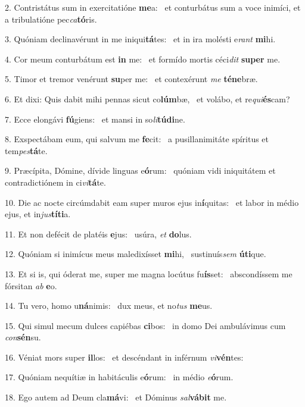 2. Contristátus sum in exercitatióne \textbf{me}a: \ast\  et conturbátus sum a voce inimíci, et a tribulatióne pec\textit{ca}\textbf{tó}ris.\

3. Quóniam declinavérunt in me iniqui\textbf{tá}tes: \ast\  et in ira molésti e\textit{rant} \textbf{mi}hi.\

4. Cor meum conturbátum est \textbf{in} me: \ast\  et formído mortis céci\textit{dit} \textbf{su}\textbf{per} me.\

5. Timor et tremor venérunt \textbf{su}per me: \ast\  et contexérunt \textit{me} \textbf{té}\textbf{ne}bræ.\

6. Et dixi: Quis dabit mihi pennas sicut co\textbf{lúm}bæ, \ast\  et volábo, et re\textit{qui}\textbf{és}cam?\

7. Ecce elongávi \textbf{fú}giens: \ast\  et mansi in so\textit{li}\textbf{tú}\textbf{di}ne.\

8. Exspectábam eum, qui salvum me \textbf{fe}cit: \ast\  a pusillanimitáte spíritus et tem\textit{pes}\textbf{tá}te.\

9. Præcípita, Dómine, dívide linguas e\textbf{ó}rum: \ast\  quóniam vidi iniquitátem et contradictiónem in ci\textit{vi}\textbf{tá}te.\

10. Die ac nocte circúmdabit eam super muros ejus in\textbf{í}quitas: \ast\  et labor in médio ejus, et in\textit{jus}\textbf{tí}\textbf{ti}a.\

11. Et non defécit de platéis \textbf{e}jus: \ast\  usúra, \textit{et} \textbf{do}lus.\

12. Quóniam si inimícus meus maledixísset \textbf{mi}hi, \ast\  sustinuís\textit{sem} \textbf{ú}\textbf{ti}que.\

13. Et si is, qui óderat me, super me magna locútus fu\textbf{ís}set: \ast\  abscondíssem me fórsitan \textit{ab} \textbf{e}o.\

14. Tu vero, homo u\textbf{ná}nimis: \ast\  dux meus, et no\textit{tus} \textbf{me}us.\

15. Qui simul mecum dulces capiébas \textbf{ci}bos: \ast\  in domo Dei ambulávimus cum \textit{con}\textbf{sén}su.\

16. Véniat mors super \textbf{il}los: \ast\  et descéndant in inférnum \textit{vi}\textbf{vén}tes:\

17. Quóniam nequítiæ in habitáculis e\textbf{ó}rum: \ast\  in médio \textit{e}\textbf{ó}rum.\

18. Ego autem ad Deum cla\textbf{má}vi: \ast\  et Dóminus \textit{sal}\textbf{vá}\textbf{bit} me.\

